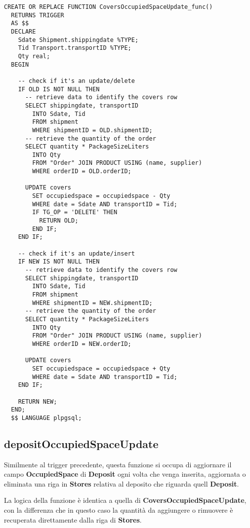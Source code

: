 \newpage

\begin{lstlisting}[caption={Funzione \textbf{CoversOccupiedSpaceUpdate}}]
  CREATE OR REPLACE FUNCTION CoversOccupiedSpaceUpdate_func()
  RETURNS TRIGGER
  AS $$
  DECLARE
    Sdate Shipment.shippingdate %TYPE;
    Tid Transport.transportID %TYPE;
    Qty real;
  BEGIN

    -- check if it's an update/delete
    IF OLD IS NOT NULL THEN
      -- retrieve data to identify the covers row
      SELECT shippingdate, transportID
        INTO Sdate, Tid
        FROM shipment
        WHERE shipmentID = OLD.shipmentID;
      -- retrieve the quantity of the order
      SELECT quantity * PackageSizeLiters
        INTO Qty
        FROM "Order" JOIN PRODUCT USING (name, supplier)
        WHERE orderID = OLD.orderID;

      UPDATE covers
        SET occupiedspace = occupiedspace - Qty
        WHERE date = Sdate AND transportID = Tid;
        IF TG_OP = 'DELETE' THEN
          RETURN OLD;
        END IF;
    END IF;

    -- check if it's an update/insert
    IF NEW IS NOT NULL THEN
      -- retrieve data to identify the covers row
      SELECT shippingdate, transportID
        INTO Sdate, Tid
        FROM shipment
        WHERE shipmentID = NEW.shipmentID;
      -- retrieve the quantity of the order
      SELECT quantity * PackageSizeLiters
        INTO Qty
        FROM "Order" JOIN PRODUCT USING (name, supplier)
        WHERE orderID = NEW.orderID;

      UPDATE covers
        SET occupiedspace = occupiedspace + Qty
        WHERE date = Sdate AND transportID = Tid;
    END IF;

    RETURN NEW;
  END;
  $$ LANGUAGE plpgsql;
\end{lstlisting}

\subsection{\textbf{depositOccupiedSpaceUpdate}}

Similmente al trigger precedente, questa funzione si occupa di aggiornare il campo \textbf{OccupiedSpace} di \textbf{Deposit} ogni volta che venga inserita, aggiornata o eliminata una riga in \textbf{Stores} relativa al deposito che riguarda quell \textbf{Deposit}.

La logica della funzione è identica a quella di \textbf{CoversOccupiedSpaceUpdate}, con la differenza che in questo caso la quantità da aggiungere o rimuovere è recuperata direttamente dalla riga di \textbf{Stores}.

